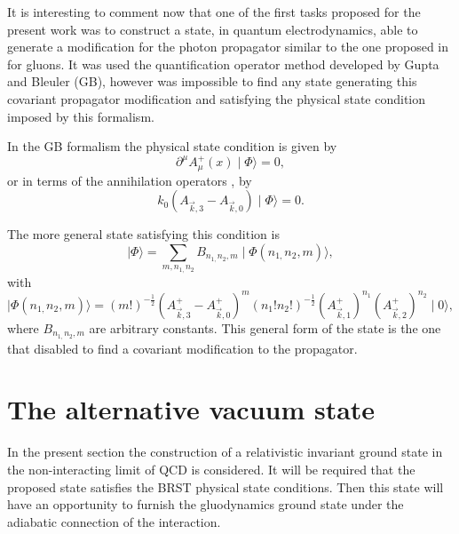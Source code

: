 \documentclass[12pt,letterpaper]{report}
\begin{document}
It is interesting to comment now that one of the first tasks
proposed for the present work was to construct a state, in quantum
electrodynamics, able to generate a modification for the photon
propagator similar to the one proposed in \cite{Cabo} for gluons.
It was used the quantification operator method developed by Gupta
and Bleuler (GB), however was impossible to find any state
generating this covariant propagator modification and satisfying
the physical state condition imposed by this formalism.

In the GB formalism the physical state condition is given by
\[
\partial ^\mu A_\mu ^{+}\left(x\right) \mid \Phi \rangle =0,
\]
or in terms of the annihilation operators \cite{Sokolov}, by
\[
k_0\left(A_{\vec{k},3}-A_{\vec{k},0}\right) \mid \Phi \rangle =0.
\]

The more general state satisfying this condition is
\cite{GuptaTex}
\[
\mid \Phi \rangle =\sum\limits_{m,n_{1,}n_2}B_{n_{1,}n_2,m}\mid
\Phi \left(n_{1,}n_2,m\right) \rangle,
\]
with
\[
\mid \Phi \left(n_{1,}n_2,m\right) \rangle =\left(m!\right)
^{-\frac 12}\left(A_{\vec{k},3}^{+}-A_{\vec{k},0}^{+}\right)
^m\left(n_1!n_2!\right) ^{-\frac 12}\left(
A_{\vec{k},1}^{+}\right) ^{n_1}\left(A_{ \vec{k},2}^{+}\right)
^{n_2}\mid 0\rangle,
\]
where $B_{n_{1,}n_2,m}$ are arbitrary constants. This general form
of the state is the one that disabled to find a covariant
modification to the propagator.

\section{The alternative vacuum state}

In the present section the construction of a relativistic
invariant ground state in the non-interacting limit of QCD is
considered. It will be required that the proposed state satisfies
the BRST physical state conditions. Then this state will have an
opportunity to furnish the gluodynamics ground state under the
adiabatic connection of the interaction.
\end{document}
